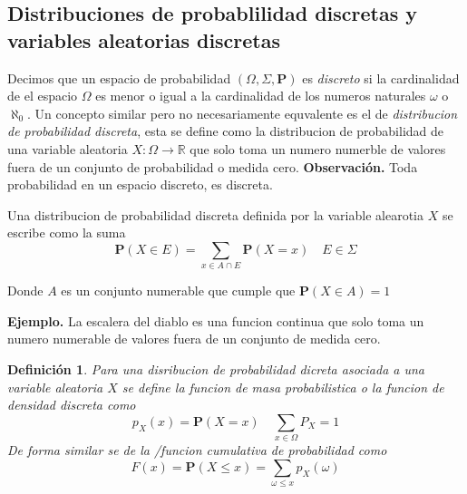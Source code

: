 \documentclass[letterpaper]{article}
\newtheorem{def.}{Definici\'on}[section]
\newcommand{\prob}{\textbf{P}}
\newcommand{\eje}{{\newline \noindent \sc \textbf{Ejemplo. }}}
\newcommand{\obs}{{\newline \noindent \sc \textbf{Observación. }}}
\newcommand{\om}{\ensuremath{\Omega}}
\newcommand{\sig}{\ensuremath{\Sigma}}
\newcommand{\re}{\ensuremath{\mathbb R }}
\begin{document}
\subsection{Distribuciones de probablilidad discretas y variables aleatorias discretas}
\label{sec:orgf6a1460}

\noindent Decimos que un espacio de probabilidad \((\om,\sig,\prob)\) es \emph{discreto} si la cardinalidad de el espacio \(\om\) es menor o igual a la cardinalidad de los numeros naturales \(\omega\) o \(\aleph_0\). Un concepto similar pero no necesariamente equvalente es el de \emph{distribucion de probabilidad discreta}, esta se define como la distribucion de probabilidad de una variable aleatoria \(X:\om\rightarrow\re\) que solo toma un numero numerble de valores fuera de un conjunto de probabilidad o medida cero.
\obs Toda probabilidad en un espacio discreto, es discreta.

Una distribucion de probabilidad discreta definida por la variable alearotia \(X\) se escribe como la suma
\[
    \prob(X\in E)=\sum_{x\in A\cap E}\prob(X=x)\quad E\in\sig
\]

Donde \(A\) es un conjunto numerable que cumple que \(\prob(X\in A)=1\)

\eje La escalera del diablo es una funcion continua que solo toma un numero numerable de valores fuera de un conjunto de medida cero.

\begin{def.}
Para una disribucion de probabilidad dicreta asociada a una variable aleatoria \(X\) se define la \emph{funcion de masa probabilistica} o la \emph{funcion de densidad discreta} como
\[
        p_{X}(x)=\prob(X=x)\quad\sum_{x\in\om}P_{X}=1
\]
De forma similar se de la /funcion cumulativa de probabilidad como
\[
        F(x)=\prob(X\leq x)=\sum_{\omega\leq x}p_{X}(\omega)
\]
\end{def.}
\end{document}
